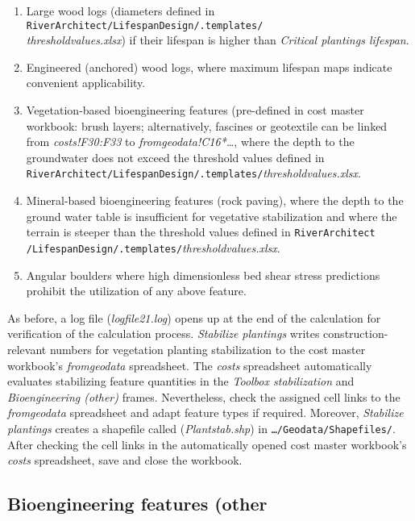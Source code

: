 \begin{enumerate}
\def\labelenumi{\arabic{enumi})}
\item Large wood logs (diameters defined in \texttt{RiverArchitect/LifespanDesign/.templates/}\\
	\emph{threshold{\myUnderscore}values.xlsx}) if their lifespan is higher than \emph{Critical plantings lifespan}.
\item Engineered (anchored) wood logs, where maximum lifespan maps indicate convenient applicability.
\item Vegetation-based bioengineering features (pre-defined in cost master workbook: brush layers; alternatively, fascines or geotextile can be linked from \emph{costs!F30:F33} to \emph{from{\myUnderscore}geodata!C16*\ldots{}}, where the depth to the groundwater does not exceed the threshold values defined in \texttt{RiverArchitect/LifespanDesign/.templates/}\emph{threshold{\myUnderscore}values.xlsx}.
\item Mineral-based bioengineering features (rock paving), where the depth to the ground water table is insufficient for vegetative stabilization and where the terrain is steeper than the threshold values defined in \texttt{RiverArchitect /LifespanDesign/.templates/}\emph{threshold{\myUnderscore}values.xlsx}.
\item Angular boulders where high dimensionless bed shear stress predictions prohibit the utilization of any above feature.
\end{enumerate}


As before, a log file (\emph{logfile{\myUnderscore}21.log}) opens up at the end of the calculation for verification of the calculation process. \emph{Stabilize plantings} writes construction-relevant numbers for vegetation planting stabilization to the cost master workbook's \emph{from{\myUnderscore}geodata} spreadsheet. The \emph{costs} spreadsheet automatically evaluates stabilizing feature quantities in the \emph{Toolbox stabilization} and \emph{Bioengineering (other)} frames. Nevertheless, check the assigned cell links to the \emph{from{\myUnderscore}geodata} spreadsheet and adapt feature types if required. Moreover, \emph{Stabilize plantings} creates a shapefile called (\emph{Plant{\myUnderscore}stab.shp}) in \texttt{\ldots{}/Geodata/Shapefiles/}. After checking the cell links in the automatically opened cost master workbook's \emph{costs} spreadsheet, save and close the workbook.

\subsection{Bioengineering features (other} 

